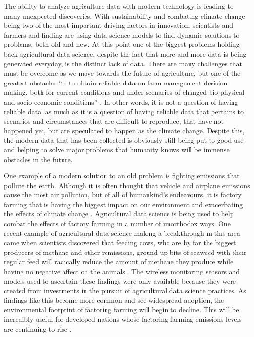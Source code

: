 \documentclass[sigconf]{acmart}
\begin{document}
The ability to analyze agriculture data with modern technology is leading to many unexpected discoveries. With sustainability and combating climate change being two of the most important driving factors in innovation, scientists and farmers and finding are using data science models to find dynamic solutions to problems, both old and new. At this point one of the biggest problems holding back agricultural data science, despite the fact that more and more data is being generated everyday, is the distinct lack of data. There are many challenges that must be overcome as we move towards the future of agriculture, but one of the greatest obstacles ``is to obtain reliable data on farm management decision making, both for current conditions and under scenarios of changed bio-physical and socio-economic conditions'' \cite{capalbo2017}. In other words, it is not a question of having reliable data, as much as it is a question of having reliable data that pertains to scenarios and circumstances that are difficult to reproduce, that have not happened yet, but are speculated to happen as the climate change. Despite this, the modern data that has been collected is obviously still being put to good use and helping to solve major problems that humanity knows will be immense obstacles in the future.

One example of a modern solution to an old problem is fighting emissions that pollute the earth. Although it is often thought that vehicle and airplane emissions cause the most air pollution, but of all of humankind's endeavours, it is factory farming that is having the biggest impact on our environment and exacerbating the effects of climate change \cite{caro2014}. Agricultural data science is being used to help combat the effects of factory farming in a number of unorthodox ways. One recent example of agricultural data science making a breakthrough in this area came when scientists discovered that feeding cows, who are by far the biggest producers of methane and other remissions, ground up bits of seaweed with their regular feed will radically reduce the amount of methane they produce while having no negative affect on the animals \cite{kinley2016}. The wireless monitoring sensors and models used to ascertain these findings were only available because they were created from investments in the pursuit of agricultural data science practices. As findings like this become more common and see widespread adoption, the environmental footprint of factoring farming will begin to decline. This will be incredibly useful for developed nations whose factoring farming emissions levels are continuing to rise \cite{caro2014}.
\end{document}
